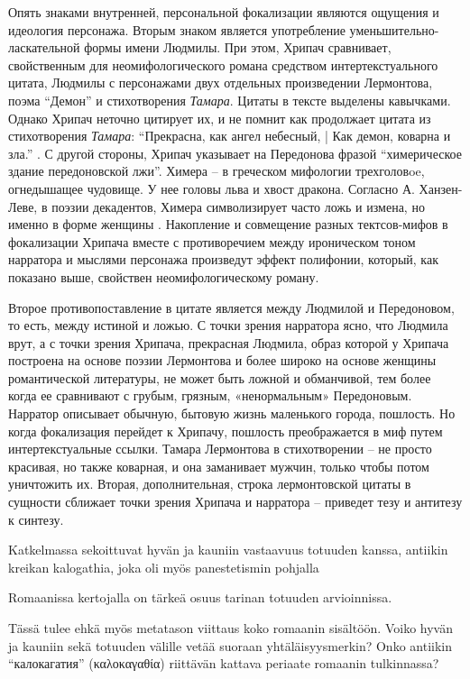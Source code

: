 \documentclass[12pt,a4paper]{article}
\begin{document}
Опять знаками внутренней, персональной фокализации являются ощущения и идеология персонажа. Вторым знаком является употребление уменьшительно-ласкательной формы имени Людмилы.  При этом, Хрипач сравнивает, свойственным для неомифологического романа средством интертекстуального цитата, Людмилы с персонажами двух отдельных произведении Лермонтова, поэма \enquote{Демон} и стихотворения \emph{Тамара}. Цитаты в тексте выделены кавычками. Однако Хрипач неточно цитирует их, и не помнит как продолжает цитата из стихотворения \emph{Тамара}: \enquote{Прекрасна, как ангел небесный, | Как демон, коварна и зла.} \parencite[194]{lermontov2000}. С другой стороны, Хрипач указывает на Передонова фразой \enquote{химерическое здание передоновской лжи}. Химера – в греческом мифологии трехголовoe, огнедышащее чудовище. У нее головы льва и хвост дракона. Согласно А. Ханзен-Леве, в поэзии декадентов, Химера символизирует часто ложь и измена, но именно в форме женщины \parencite[200]{hansen-love1999}. Накопление и совмещение разных тектсов-мифов в фокализации Хрипача вместе с противоречием между ироническом тоном нарратора и мыслями персонажа произведут эффект полифонии, который, как показано выше, свойствен неомифологическому роману.

Второе противопоставление в цитате является между Людмилой и Передоновом, то есть, между истиной и ложью. С точки зрения нарратора ясно, что Людмила врут, а с точки зрения Хрипача, прекрасная Людмила, образ которой у Хрипача построена на основе поэзии Лермонтова и более широко на основе женщины романтической литературы, не может быть ложной и обманчивой, тем более когда ее сравнивают с грубым, грязным, «ненормальным» Передоновым. Нарратор описывает обычную, бытовую жизнь маленького города, пошлость. Но когда фокализация перейдет к Хрипачу, пошлость преображается в миф путем интертекстуальные ссылки. Тамара Лермонтова в стихотворении – не просто красивая, но также коварная, и она заманивает мужчин, только чтобы потом уничтожить их. Вторая, дополнительная, строка лермонтовской цитаты в сущности сближает точки зрения Хрипача и нарратора – приведет тезу и антитезу к синтезу.  



Katkelmassa sekoittuvat hyvän ja kauniin vastaavuus totuuden kanssa, antiikin kreikan kalogathia, joka oli myös panestetismin pohjalla

Romaanissa kertojalla on tärkeä osuus tarinan totuuden arvioinnissa. 

Tässä tulee ehkä myös metatason viittaus koko romaanin sisältöön. Voiko hyvän ja kauniin sekä totuuden välille vetää suoraan yhtäläisyysmerkin? Onko antiikin \enquote{калокагатия} (\foreignlanguage{greek}{καλοκαγαθία}) riittävän kattava periaate romaanin tulkinnassa?
\end{document}
